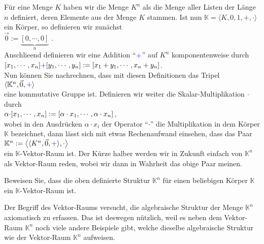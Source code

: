 \example
F\"{u}r eine Menge $K$ haben wir die Menge $K^n$ als die Menge aller Listen der L\"{a}nge $n$ definiert,
deren Elemente aus der Menge $K$ stammen.  Ist nun $\mathbb{K} = \langle K, 0, 1, +, \cdot\rangle$
ein K\"{o}rper, so definieren wir zun\"{a}chst
\\[0.2cm]
\hspace*{1.3cm}
$\vec{0} := \underbrace{[0, \cdots, 0]}_n$ .
\\[0.2cm]
Anschlie\3end definieren wir eine Addition ``${\color{blue}{+}}$'' auf $K^n$ komponentenweise durch
\\[0.2cm]
\hspace*{1.3cm}
$[x_1, \cdots, x_n] {\color{blue}{+}} [y_1, \cdots, y_n] := [x_1 + y_1, \cdots, x_n + y_n]$.
\\[0.2cm]
Nun k\"{o}nnen Sie nachrechnen, dass mit diesen Definitionen das Tripel
\\[0.2cm]
\hspace*{1.3cm}
$\langle \mathbb{K}^n, \vec{0}, {\color{blue}+}\rangle$
\\[0.2cm]
eine kommutative Gruppe ist.  Definieren wir weiter die Skalar-Multiplikation
${\color{blue}\cdot}$ durch
\\[0.2cm]
\hspace*{1.3cm}
$\alpha {\color{blue}{\cdot}} [x_1, \cdots, x_n] := [\alpha \cdot x_1, \cdots, \alpha \cdot x_n]$,
\\[0.2cm]
wobei in den Ausdr\"{u}cken $\alpha \cdot x_i$ der Operator ``$\cdot$'' die Multiplikation in dem K\"{o}rper $\mathbb{K}$ bezeichnet,
dann l\"{a}sst sich mit etwas Rechenaufwand einsehen, dass das Paar
\\[0.2cm]
\hspace*{1.3cm}
$\mathbb{K}^n := \bigl\langle \langle K^n, \vec{0}, {\color{blue}{+}} \rangle, {\color{blue}{\cdot}} \bigr\rangle$ 
\\[0.2cm]
ein $\mathbb{K}$-Vektor-Raum ist.  Der K\"{u}rze halber werden wir in Zukunft einfach von $\mathbb{K}^n$ als Vektor-Raum reden, wobei wir dann in Wahrheit das obige Paar meinen. 
\eox

\exerciseStar
Beweisen Sie, dass die oben definierte Struktur $\mathbb{K}^n$ f\"{u}r einen beliebigen K\"{o}rper
$\mathbb{K}$ ein $\mathbb{K}$-Vektor-Raum ist. \eox 


Der Begriff des Vektor-Raums versucht, die algebraische Struktur der Menge $\mathbb{K}^n$
axiomatisch zu erfassen.  Das ist deswegen n\"{u}tzlich, weil es neben dem Vektor-Raum 
$\mathbb{K}^n$ noch viele andere Beispiele gibt, welche dieselbe algebraische
Struktur wie der Vektor-Raum $\mathbb{K}^n$ aufweisen.  


